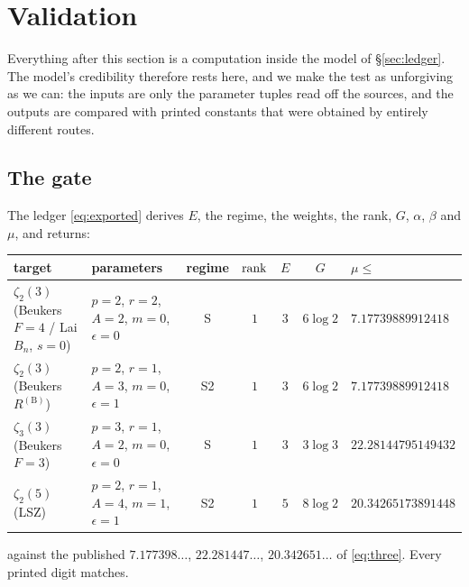\section{Validation}\label{sec:validation}

Everything after this section is a computation inside the model of \S\ref{sec:ledger}. The
model's credibility therefore rests here, and we make the test as unforgiving as we can: the
inputs are only the parameter tuples read off the sources, and the outputs are compared with
printed constants that were obtained by entirely different routes.

\subsection{The gate}\label{ss:gate}

\begin{finding}\label{find:gate}
 The ledger
\eqref{eq:exported} derives $E$, the regime, the weights, the rank, $G$, $\alpha$, $\beta$
and $\mu$, and returns:
\begin{center}
\scriptsize\setlength{\tabcolsep}{4pt}
\begin{tabular}{llccccl}
\toprule
target & parameters & regime & $\operatorname{rank}$ & $E$ & $G$ & $\mu\le$ \\
\midrule
$\zeta_2(3)$ (Beukers $F=4$ / Lai $B_n$, $s=0$) & $p{=}2$, $r{=}2$, $A{=}2$, $m{=}0$, $\epsilon{=}0$
 & S & $1$ & $3$ & $6\log2$ & $7.17739889912418$\\
$\zeta_2(3)$ (Beukers $R^{(\mathrm B)}$) & $p{=}2$, $r{=}1$, $A{=}3$, $m{=}0$, $\epsilon{=}1$
 & S2 & $1$ & $3$ & $6\log2$ & $7.17739889912418$\\
$\zeta_3(3)$ (Beukers $F=3$) & $p{=}3$, $r{=}1$, $A{=}2$, $m{=}0$, $\epsilon{=}0$
 & S & $1$ & $3$ & $3\log3$ & $22.28144795149432$\\
$\zeta_2(5)$ (LSZ) & $p{=}2$, $r{=}1$, $A{=}4$, $m{=}1$, $\epsilon{=}1$
 & S2 & $1$ & $5$ & $8\log2$ & $20.34265173891448$\\
\bottomrule
\end{tabular}
\end{center}
against the published $7.177398\dots$, $22.281447\dots$, $20.342651\dots$ of
\eqref{eq:three}. Every printed digit matches.
\end{finding}

